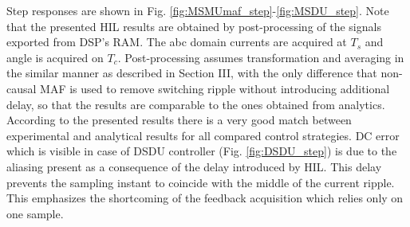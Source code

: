 \documentclass[journal]{IEEEtran}
\begin{document}
Step responses are shown in Fig. \ref{fig:MSMUmaf_step}-\ref{fig:MSDU_step}. Note that the presented HIL results are obtained by post-processing of the signals exported from DSP’s RAM. The abc domain currents are acquired at $T_s$ and angle is acquired on $T_c$. Post-processing assumes transformation and averaging in the similar manner as described in Section III, with the only difference that non-causal MAF is used to remove switching ripple without introducing additional delay, so that the results are comparable to the ones obtained from analytics. According to the presented results there is a very good match between experimental and analytical results for all compared control strategies. DC error which is visible in case of DSDU controller (Fig. \ref{fig:DSDU_step}) is due to the aliasing present as a consequence of the delay introduced by HIL. This delay prevents the sampling instant to coincide with the middle of the current ripple. This emphasizes the shortcoming of the feedback acquisition which relies only on one sample. 
\end{document}
